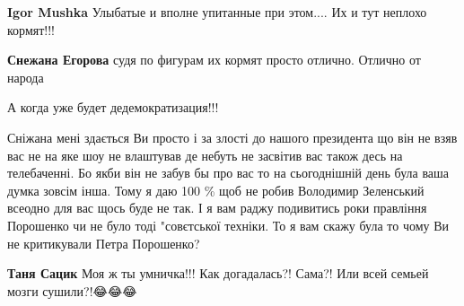 \begin{itemize}
\begin{itemize}
\textbf{Igor Mushka} Улыбатые и вполне упитанные при этом....
Их и тут неплохо кормят!!!

 
\textbf{Снежана Егорова} судя по фигурам их кормят просто отлично. Отлично от народа
\end{itemize}

 
А когда уже будет дедемократизация!!!

 

Сніжана мені здається Ви просто і за злості до нашого президента що він не взяв
вас не на яке шоу не влаштував де небуть не засвітив вас також десь на
телебаченні. Бо якби він не забув бы про вас то на сьогоднішній день була ваша
думка зовсім інша. Тому я даю 100 \% щоб не робив Володимир Зеленський всеодно
для вас щось буде не так. І я вам раджу подивитись роки правління Порошенко чи
не було тоді "совєтської техніки. То я вам скажу була то чому Ви не критикували
Петра Порошенко?

\begin{itemize}
 
\textbf{Таня Сацик} Моя ж ты умничка!!!
Как догадалась?!
Сама?!
Или всей семьей мозги сушили?!😂😂😂

 

\end{itemize}
\end{itemize}
